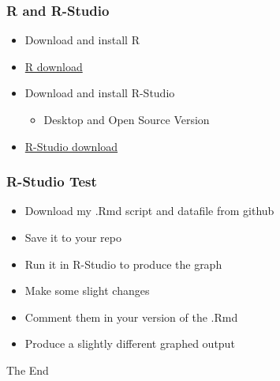 \documentclass[14pt]{beamer}
\begin{document}
\begin{frame}
\frametitle{R and R-Studio}
\begin{itemize}
	\item Download and install R
	\item \href{https://cran.rstudio.com/}{R download}
	\item Download and install R-Studio
	\begin{itemize}
		\item Desktop and Open Source Version
	\end{itemize}
	\item \href{https://www.rstudio.com/products/rstudio/download/}{R-Studio download}
\end{itemize}
\end{frame}

\begin{frame}
\frametitle{R-Studio Test}
\begin{itemize}
	\item Download my .Rmd script and datafile from github
	\item Save it to your repo
	\item Run it in R-Studio to produce the graph
	\item Make some slight changes
	\item Comment them in your version of the .Rmd
	\item Produce a slightly different graphed output
\end{itemize}
\end{frame}

\begin{frame}
\Huge{\centerline{The End}}
\end{frame}

\end{document}
